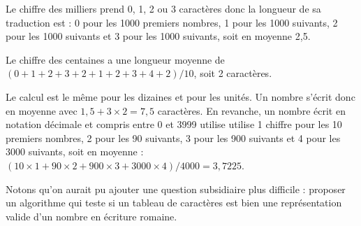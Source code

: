 Le chiffre des milliers prend 0, 1, 2 ou 3 caractères donc la longueur de sa traduction est : 0 pour les 1000 premiers nombres, 1 pour les 1000 suivants, 2 pour les 1000 suivants et 3 pour les 1000 suivants, soit en moyenne 2,5.
\medskip

Le chiffre des centaines a une longueur moyenne de $(0+1+2+3+2+1+2+3+4+2)/10$, soit 2 caractères.
\medskip

Le calcul est le même pour les dizaines et pour les unités. Un nombre s'écrit donc en moyenne avec $1,5+3\times2=7,5$ caractères. En revanche, un nombre écrit en notation décimale et compris entre 0 et 3999 utilise utilise 1 chiffre pour les 10 premiers nombres, 2 pour les 90 suivants, 3 pour les 900 suivants et 4 pour les 3000 suivants, soit en moyenne : $(10\times1+90\times2+900\times3+3000\times4)/4000=3,7225$.
\medskip

Notons qu'on aurait pu ajouter une question subsidiaire plus difficile : proposer un algorithme qui teste si un tableau de caractères est bien une représentation valide d'un nombre en écriture romaine.
\bigskip

\Fin
